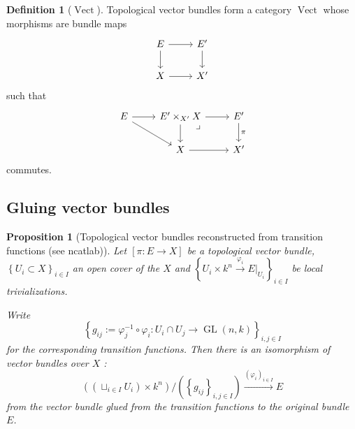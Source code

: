 \documentclass[reqno]{amsart}
\newtheorem{proposition}[theorem]{Proposition}
\theoremstyle{definition}
\newtheorem{definition}[theorem]{Definition}
\theoremstyle{remark}
\DeclareMathOperator{\Vect}{Vect}
\DeclareMathOperator{\GL}{GL}
\begin{document}
    \begin{definition}[$\Vect$]
        Topological vector bundles form a category $\Vect$
        whose morphisms are
        bundle maps
         \begin{equation*}
        \begin{tikzcd}
            E \ar[d] \ar[r] & E' \ar[d] \\
            X \ar[r] & X'
        \end{tikzcd}
        \end{equation*}
        such that
    \begin{equation*}
    \begin{tikzcd}
        E \ar[r] \ar[dr] & E' \times_{X'} X \ar[r]
        \ar[d] \ar[dr, phantom, "\lrcorner", very near start] & E'
        \ar[d, "\pi"] \\
                                       & X \ar[r] & X'
    \end{tikzcd}
    \end{equation*}
    commutes.
    \end{definition}


    \subsection{Gluing vector bundles}
    
    \begin{proposition}[Topological vector bundles reconstructed
        from transition functions (see ncatlab)]
        Let $\left[ \pi \colon E \to X \right] $ be a 
        topological vector bundle,
        $\left\{ U_i \subset X \right\}_{i \in I}$ an open
        cover of the $X$ and
        $\left\{ U_i \times k^{n}
        \stackrel{\varphi_i}{\to } E|_{U_i} \right\}_{i \in I} $
        be local trivializations. 

        Write
        \[
        \left\{ g_{ij} :=
        \varphi_j^{-1} \circ \varphi_i \colon
    U_i \cap U_j \to \GL (n,k) \right\}_{i,j \in I}
        \] 
        for the corresponding transition functions. Then there
        is an isomorphism of vector bundles over
        $X$ :
        \[
            \left( \left( \sqcup_{i \in I} U_i \right) \times 
            k^{n} \right) / \left( \left\{ g_{ij} \right\}_{i,j
        \in I} \right) \stackrel{\left( \varphi_i \right)_{i
        \in I}}{\to } E
        \] 
        from the vector bundle glued from the transition
        functions to the original bundle $E$.
    \end{proposition}
\end{document}
